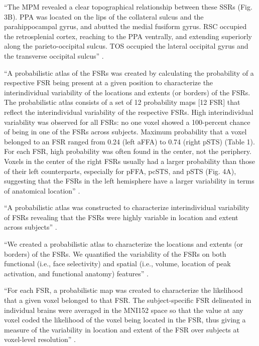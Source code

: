 ``The MPM revealed a clear topographical relationship between these SSRs (Fig.
3B).
%
PPA was located on the lips of the collateral sulcus and the parahippocampal
gyrus, and abutted the medial fusiform gyrus.
%
RSC occupied the retrosplenial cortex, reaching to the PPA ventrally, and
extending superiorly along the parieto-occipital sulcus.
%
TOS occupied the lateral occipital gyrus and the transverse occipital sulcus''
\citep{zhen2017quantifying}.




``A probabilistic atlas of the FSRs was created by calculating the probability
of a respective FSR being present at a given position to characterize the
interindividual variability of the locations and extents (or borders) of the
FSRs.
%
The probabilistic atlas consists of a set of 12 probability maps [12 FSR] that
reflect the interindividual variability of the respective FSRs.
%
High interindividual variability was observed for all FSRs: no one voxel showed
a 100-percent chance of being in one of the FSRs across subjects.
%
Maximum probability that a voxel belonged to an FSR ranged from 0.24 (left aFFA)
to 0.74 (right pSTS) (Table 1).
%
For each FSR, high probability was often found in the center, not the periphery.
%
Voxels in the center of the right FSRs usually had a larger probability than
those of their left counterparts, especially for pFFA, pcSTS, and pSTS (Fig.
4A), suggesting that the FSRs in the left hemisphere have a larger variability
in terms of anatomical location'' \citet{zhen2015quantifying}.

``A probabilistic atlas was constructed to characterize interindividual
variability of FSRs revealing that the FSRs were highly variable in location and
extent across subjects'' \citep{zhen2015quantifying}.

``We created a probabilistic atlas to characterize the locations and extents (or
borders) of the FSRs.
%
We quantified the variability of the FSRs on both functional (i.e., face
selectivity) and spatial (i.e., volume, location of peak activation, and
functional anatomy) features'' \citep{zhen2015quantifying}.

``For each FSR, a probabilistic map was created to characterize the likelihood
that a given voxel belonged to that FSR.
%
The subject-specific FSR delineated in individual brains were averaged in the
MNI152 space so that the value at any voxel coded the likelihood of the voxel
being located in the FSR, thus giving a measure of the variability in location
and extent of the FSR over subjects at voxel-level resolution''
\citep{zhen2015quantifying}.



